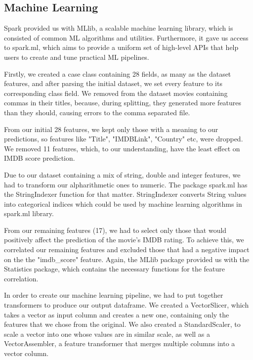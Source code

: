 \documentclass[letterpaper,twocolumn,10pt]{article}
\begin{document}
\subsection{Machine Learning}
Spark provided us with MLlib, a scalable machine learning library, which is consisted of common ML algorithms and utilities. Furthermore, it gave us access to spark.ml, which aims to provide a uniform set of high-level APIs that help users to create and tune practical ML pipelines. 

\par Firstly, we created a case class containing 28 fields, as many as the dataset features, and after parsing the initial dataset, we set every feature to its corresponding class field. We removed from the dataset movies containing commas in their titles, because, during splitting, they generated more features than they should, causing errors to the comma separated file.\par 

From our initial 28 features, we kept only those with a meaning to our predictions, so features like "Title", "IMDBLink", "Country" etc, were dropped. We removed 11 features, which, to our understanding, have the least effect on IMDB score prediction. \par 

Due to our dataset containing a mix of string, double and integer features, we had to transform our alpharithmetic ones to numeric. The package spark.ml has the StringIndexer function for that matter. StringIndexer converts String values into categorical indices which could be used by machine learning algorithms in spark.ml library.\par 

From our remaining features (17), we had to select only those that would positively affect the prediction of the movie's IMDB rating. To achieve this, we correlated our remaining features and excluded those that had a negative impact on the the "imdb\_score" feature. Again, the MLlib package provided us with the Statistics package, which contains the necessary functions for the feature correlation.\par 

In order to create our machine learning pipeline, we had to put together transformers to produce our output dataframe. We created a VectorSlicer, which takes a vector as input column and creates a new one, containing only the features that we chose from the original. We also created a StandardScaler, to scale a vector into one whose values are in similar scale, as well as a VectorAssembler, a feature transformer that merges multiple columns into a vector column.\par 
\end{document}
